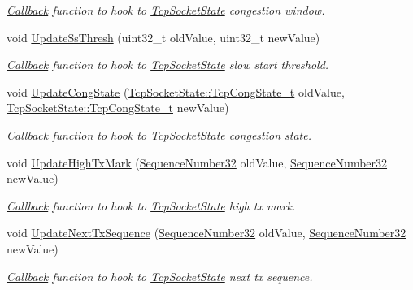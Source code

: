 \begin{DoxyCompactItemize}
\begin{DoxyCompactList}\small\item\em \hyperlink{classns3_1_1Callback}{Callback} function to hook to \hyperlink{classns3_1_1TcpSocketState}{Tcp\+Socket\+State} congestion window. \end{DoxyCompactList}\item 
void \hyperlink{classns3_1_1TcpSocketBase_aa1abe21f8c190e2ab5a4b454ffc466e3}{Update\+Ss\+Thresh} (uint32\+\_\+t old\+Value, uint32\+\_\+t new\+Value)
\begin{DoxyCompactList}\small\item\em \hyperlink{classns3_1_1Callback}{Callback} function to hook to \hyperlink{classns3_1_1TcpSocketState}{Tcp\+Socket\+State} slow start threshold. \end{DoxyCompactList}\item 
void \hyperlink{classns3_1_1TcpSocketBase_a8c31591889130527c14c4b2a5d0a2a4b}{Update\+Cong\+State} (\hyperlink{classns3_1_1TcpSocketState_a6fc313945a33d48fd60cbffe0c787b19}{Tcp\+Socket\+State\+::\+Tcp\+Cong\+State\+\_\+t} old\+Value, \hyperlink{classns3_1_1TcpSocketState_a6fc313945a33d48fd60cbffe0c787b19}{Tcp\+Socket\+State\+::\+Tcp\+Cong\+State\+\_\+t} new\+Value)
\begin{DoxyCompactList}\small\item\em \hyperlink{classns3_1_1Callback}{Callback} function to hook to \hyperlink{classns3_1_1TcpSocketState}{Tcp\+Socket\+State} congestion state. \end{DoxyCompactList}\item 
void \hyperlink{classns3_1_1TcpSocketBase_a4a2122af95f0f40965e4b8a894fd4814}{Update\+High\+Tx\+Mark} (\hyperlink{group__network_gacb2070e4e98d2d5135c9bede58f07a03}{Sequence\+Number32} old\+Value, \hyperlink{group__network_gacb2070e4e98d2d5135c9bede58f07a03}{Sequence\+Number32} new\+Value)
\begin{DoxyCompactList}\small\item\em \hyperlink{classns3_1_1Callback}{Callback} function to hook to \hyperlink{classns3_1_1TcpSocketState}{Tcp\+Socket\+State} high tx mark. \end{DoxyCompactList}\item 
void \hyperlink{classns3_1_1TcpSocketBase_ad97775a4eaa42d5fea38ea20674889c4}{Update\+Next\+Tx\+Sequence} (\hyperlink{group__network_gacb2070e4e98d2d5135c9bede58f07a03}{Sequence\+Number32} old\+Value, \hyperlink{group__network_gacb2070e4e98d2d5135c9bede58f07a03}{Sequence\+Number32} new\+Value)
\begin{DoxyCompactList}\small\item\em \hyperlink{classns3_1_1Callback}{Callback} function to hook to \hyperlink{classns3_1_1TcpSocketState}{Tcp\+Socket\+State} next tx sequence. \end{DoxyCompactList}\item 

\end{DoxyCompactItemize}
